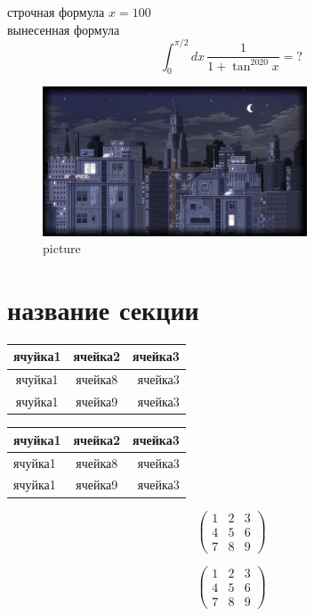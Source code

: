\documentclass[12pt]{article}
\begin{document}
строчная формула $x=100$ \\%
вынесенная формула
$$
\int_0^{\pi/2} dx\,\frac{1}{1+\tan^{2020}x}=?
$$
\begin{figure}
\centering
\includegraphics[width=0.7\textwidth]{the_last_lab/night.jpg}%
\caption{picture}
\end{figure}
\section{название секции}%

\begin{table}%
\begin{tabular}{|c|c|r|}
\hline
ячуйка1& ячейка2 & ячейка3\\
\hline ячуйка1& ячейка8 & ячейка3\\
\hline ячуйка1& ячейка9 & ячейка3\\
\hline

\end{tabular}
\end{table}




\begin{table}[h!]%
\begin{tabular}{|p{10cm}|c|r|}
\hline
ячуйка1& ячейка2 & ячейка3\\
\hline ячуйка1& ячейка8 & ячейка3\\
\hline ячуйка1& ячейка9 & ячейка3\\
\hline

\end{tabular}
\end{table}


$$\left(
\begin{array}{|c|c|c|}
1 & 2 & 3\\
4 & 5 & 6\\
7 & 8 & 9
\end{array}\right)
$$


$$
\begin{pmatrix}%
1 & 2 & 3\\
4 & 5 & 6\\
7 & 8 & 9
\end{pmatrix}
$$
\end{document}
